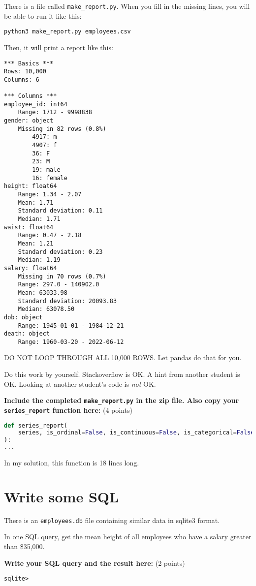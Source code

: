 \documentclass[11pt,english]{article}
\begin{document}
There is a file called \texttt{make\_report.py}.  When you fill in the missing lines, you will be able to run it like this:

\begin{Verbatim}
python3 make_report.py employees.csv 
\end{Verbatim}

Then, it will print a report like this:
\begin{Verbatim}
*** Basics ***
Rows: 10,000
Columns: 6

*** Columns ***
employee_id: int64
	Range: 1712 - 9998838
gender: object
	Missing in 82 rows (0.8%)
		4917: m
		4907: f
		36: F
		23: M
		19: male
		16: female
height: float64
	Range: 1.34 - 2.07
	Mean: 1.71
	Standard deviation: 0.11
	Median: 1.71
waist: float64
	Range: 0.47 - 2.18
	Mean: 1.21
	Standard deviation: 0.23
	Median: 1.19
salary: float64
	Missing in 70 rows (0.7%)
	Range: 297.0 - 140902.0
	Mean: 63033.98
	Standard deviation: 20093.83
	Median: 63078.50
dob: object
	Range: 1945-01-01 - 1984-12-21
death: object
	Range: 1960-03-20 - 2022-06-12
\end{Verbatim}

DO NOT LOOP THROUGH ALL 10,000 ROWS.  Let pandas do that for you.

Do this work by yourself.   Stackoverflow is OK.   A hint from another student is OK.  Looking at another student's code is \emph{not} OK.

\textbf{Include the completed  \texttt{make\_report.py} in the zip file.   Also copy your \texttt{series\_report}  function here:} (4 points)
\begin{lstlisting}[language=Python]
def series_report(
    series, is_ordinal=False, is_continuous=False, is_categorical=False
):
...
\end{lstlisting}

In my solution,  this function is 18 lines long.

\section{Write some SQL}

There is an \texttt{employees.db} file containing similar data in sqlite3 format.

In one SQL query,  get the mean height of all employees who have a salary greater than \$35,000.

\textbf{Write your SQL query and the result here:} (2 points)
\begin{lstlisting}
sqlite> 
\end{lstlisting}
\end{document}
